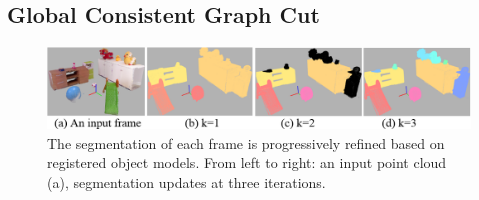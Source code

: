 \subsection{Global Consistent Graph Cut}
\label{subsec:graphcut}

\begin{figure}
\centering
\includegraphics[width=2\columnwidth]{figures/object-iterations.png}
\caption{ The segmentation of each frame is progressively refined based on registered object models. From left to right: an input point cloud (a), segmentation updates at three iterations. }
\label{fig:object-iterations}
\end{figure}

